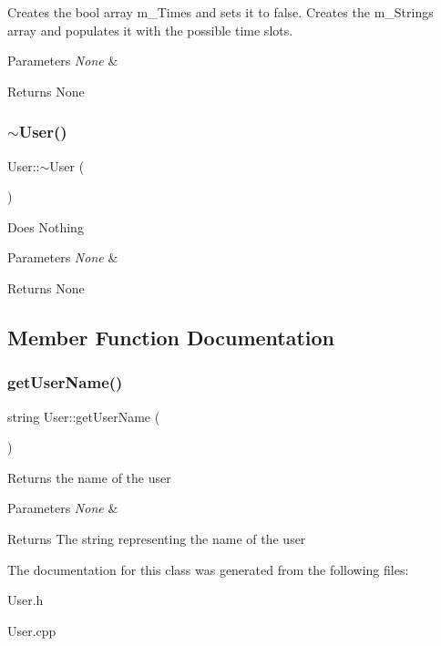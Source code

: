 Creates the bool array m\+\_\+\+Times and sets it to false. Creates the m\+\_\+\+Strings array and populates it with the possible time slots. 
\begin{DoxyParams}{Parameters}
{\em None} & \\
\hline
\end{DoxyParams}
\begin{DoxyReturn}{Returns}
None 
\end{DoxyReturn}
\mbox{\label{class_user_ac00b72ad64eb4149f7b21b9f5468c2b2}} 
\subsubsection{\texorpdfstring{$\sim$\+User()}{~User()}}
{\footnotesize\ttfamily User\+::$\sim$\+User (\begin{DoxyParamCaption}{ }\end{DoxyParamCaption})}

Does Nothing 
\begin{DoxyParams}{Parameters}
{\em None} & \\
\hline
\end{DoxyParams}
\begin{DoxyReturn}{Returns}
None 
\end{DoxyReturn}


\subsection{Member Function Documentation}
\mbox{\label{class_user_a3fcf5814ba0a2415862c892746585a46}} 
\subsubsection{\texorpdfstring{get\+User\+Name()}{getUserName()}}
{\footnotesize\ttfamily string User\+::get\+User\+Name (\begin{DoxyParamCaption}{ }\end{DoxyParamCaption})}

Returns the name of the user 
\begin{DoxyParams}{Parameters}
{\em None} & \\
\hline
\end{DoxyParams}
\begin{DoxyReturn}{Returns}
The string representing the name of the user 
\end{DoxyReturn}


The documentation for this class was generated from the following files\+:\begin{DoxyCompactItemize}
\item 
User.\+h\item 
User.\+cpp\end{DoxyCompactItemize}
